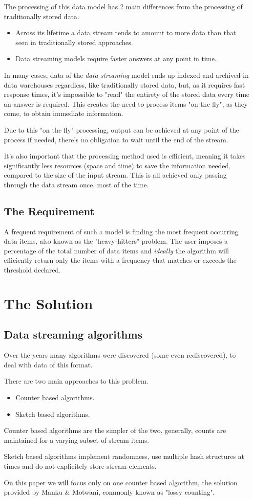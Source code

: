 \documentclass[...]{revdetua}
\begin{document}
The processing of this data model has 2 main differences from the processing of traditionally stored data.
\begin{itemize}
\item Across its lifetime a data stream tends to amount to more data than that seen in traditionally stored approaches.
\item Data streaming models require faster answers at any point in time.
\end{itemize} 

In many cases, data of the \textit{data streaming} model ends up indexed and archived in data warehouses regardless, like traditionally stored data, but, as it requires fast response times, it's impossible to "read" the entirety of the stored data every time an answer is required.  This creates the need to process items "on the fly", as they come, to obtain immediate information.\par
Due to this "on the fly" processing, output can be achieved at any point of the process if needed, there's no obligation to wait until the end of the stream.\par
It's also important that the processing method used is efficient, meaning it takes significantly less resources (space and time) to save the information needed, compared to the size of the input stream. This is all achieved only passing through the data stream once, most of the time.

\subsection{The Requirement}
A frequent requirement of such a model is finding the most frequent occurring data items, also known as the "heavy-hitters" problem.
The user imposes a percentage of the total number of data items and \textit{ideally} the algorithm will efficiently return only the items with a frequency that matches or exceeds the threshold declared.
\section{The Solution}
\subsection{Data streaming algorithms}
Over the years many algorithms were discovered (some even rediscovered), to deal with data of this format.\par
There are two main approaches to this problem.
\begin{itemize}
\item Counter based algorithms.
\item Sketch based algorithms.
\end{itemize}
Counter based algorithms are the simpler of the two, generally, counts are maintained for a varying subset of stream items.\par
Sketch based algorithms implement randomness, use multiple hash structures at times and do not explicitely store stream elements.\par
On this paper we will focus only on one counter based algorithm, the solution provided by Manku \& Motwani, commonly known as "lossy counting".
\end{document}
